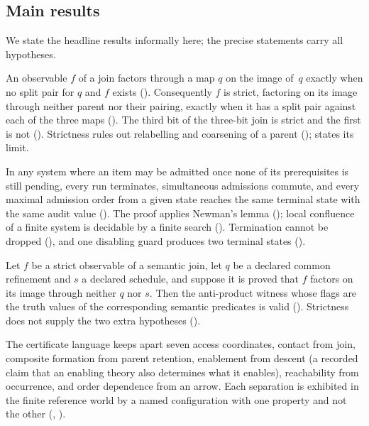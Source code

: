 \subsection{Main results}
\label{sec:intro-results}

We state the headline results informally here; the precise statements carry all
hypotheses.

\begin{headline}
An observable $f$ of a join factors through a map $q$ on the image of~$q$ exactly when no
split pair for $q$ and $f$ exists (). Consequently $f$ is strict,
factoring on its image through neither parent nor their pairing, exactly when it has a split pair
against each of the three maps (). The third bit of the three-bit
join is strict and the first is not (). Strictness rules out relabelling and
coarsening of a parent ();  states its limit.
\end{headline}

\begin{headline}
In any system where an item may be admitted once none of its prerequisites is still pending, every run
terminates, simultaneous admissions commute, and every maximal admission order from a
given state reaches the same terminal state with the same audit value
(). The proof applies Newman's lemma (); local
confluence of a finite system is decidable by a finite search ().
Termination cannot be dropped (), and one disabling guard produces two
terminal states ().
\end{headline}

\begin{headline}
Let $f$ be a strict observable of a semantic join, let $q$ be a declared common refinement
and $s$ a declared schedule, and suppose it is proved that $f$ factors on its image through
neither $q$ nor $s$. Then the anti-product witness whose flags are the truth values of the
corresponding semantic predicates is valid (). Strictness does not supply
the two extra hypotheses ().
\end{headline}

\begin{headline}
The certificate language keeps apart seven access coordinates, contact from join,
composite formation from parent retention, enablement from descent (a recorded claim that
an enabling theory also determines what it enables), reachability from
occurrence, and order dependence from an arrow. Each separation is exhibited in the finite
reference world by a named configuration with one property and not the other
(, ).
\end{headline}

